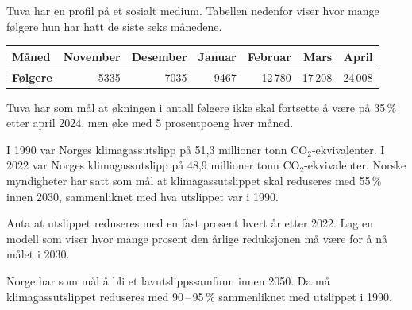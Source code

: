 Tuva har en profil på et sosialt medium. Tabellen nedenfor viser hvor mange følgere hun har
hatt de siste seks månedene.
\begin{center}
	\small
	\begin{tabular}{|l|r|r|r|r|r|r|}
		\hline
		\textbf{Måned} & November & Desember & Januar & Februar & Mars & April \\
		\hline
		\textbf{Følgere} & 5335 & 7035 & 9467 & 12\,780 & 17\,208 & 24\,008 \\
		\hline
	\end{tabular}
\end{center}
Tuva har som mål at økningen i antall følgere ikke skal fortsette å være på
35\,\% etter april 2024, men øke med 5 prosentpoeng hver måned.

I 1990 var Norges klimagassutslipp på 51,3 millioner tonn CO$_2$-ekvivalenter.
I 2022 var Norges klimagassutslipp på 48,9 millioner tonn CO$_2$-ekvivalenter.
Norske myndigheter har satt som mål at klimagassutslippet skal reduseres med
55\,\% innen 2030, sammenliknet med hva utslippet var i 1990. \os

Anta at utslippet reduseres med en fast prosent hvert år etter 2022. Lag en modell som viser hvor mange prosent den årlige reduksjonen må være for å nå målet i 2030.



Norge har som mål å bli et lavutslippssamfunn innen 2050. Da må
klimagassutslippet reduseres med 90\,--\,95\,\% sammenliknet med utslippet i 1990.


